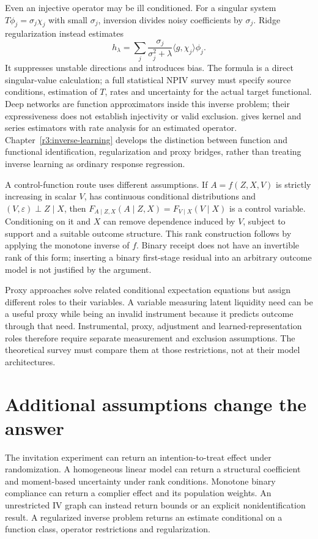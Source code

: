 Even an injective operator may be ill conditioned. For a singular system
$T\phi_j=\sigma_j\chi_j$ with small $\sigma_j$, inversion divides noisy
coefficients by $\sigma_j$. Ridge regularization instead estimates
\[
 h_\lambda=\sum_j\frac{\sigma_j}{\sigma_j^2+\lambda}
              \langle g,\chi_j\rangle\phi_j.
\]
It suppresses unstable directions and introduces bias. The formula is a
direct singular-value calculation; a full statistical NPIV survey must
specify source conditions, estimation of $T$, rates and uncertainty for
the actual target functional. Deep networks are function approximators
inside this inverse problem; their expressiveness does not establish
injectivity or valid exclusion.
\citet[Sections 2 and 4]{hall2005} gives kernel and series estimators
with rate analysis for an estimated operator. Chapter~\ref{r3:inverse-learning}
develops the distinction between function and functional identification,
regularization and proxy bridges, rather than treating inverse learning
as ordinary response regression.

A control-function route uses different assumptions. If
$A=f(Z,X,V)$ is strictly increasing in scalar $V$, has continuous
conditional distributions and $(V,\varepsilon)\perp Z\mid X$, then
$F_{A\mid Z,X}(A\mid Z,X)=F_{V\mid X}(V\mid X)$ is a control variable.
Conditioning on it and $X$ can remove dependence induced by $V$, subject
to support and a suitable outcome structure. This rank construction
follows by applying the monotone inverse of $f$. Binary receipt does not
have an invertible rank of this form; inserting a binary first-stage
residual into an arbitrary outcome model is not justified by the argument.

Proxy approaches solve related conditional expectation equations but
assign different roles to their variables. A variable measuring latent
liquidity need can be a useful proxy while being an invalid instrument
because it predicts outcome through that need. Instrumental, proxy,
adjustment and learned-representation roles therefore require separate
measurement and exclusion assumptions. The theoretical survey must
compare them at those restrictions, not at their model architectures.

\section{Additional assumptions change the answer}
\label{r3:iv-contract}
The invitation experiment can return an intention-to-treat effect under
randomization. A homogeneous linear model can return a structural
coefficient and moment-based uncertainty under rank conditions. Monotone
binary compliance can return a complier effect and its population weights.
An unrestricted IV graph can instead return bounds or an explicit
nonidentification result. A regularized inverse problem returns an estimate
conditional on a function class, operator restrictions and regularization.

